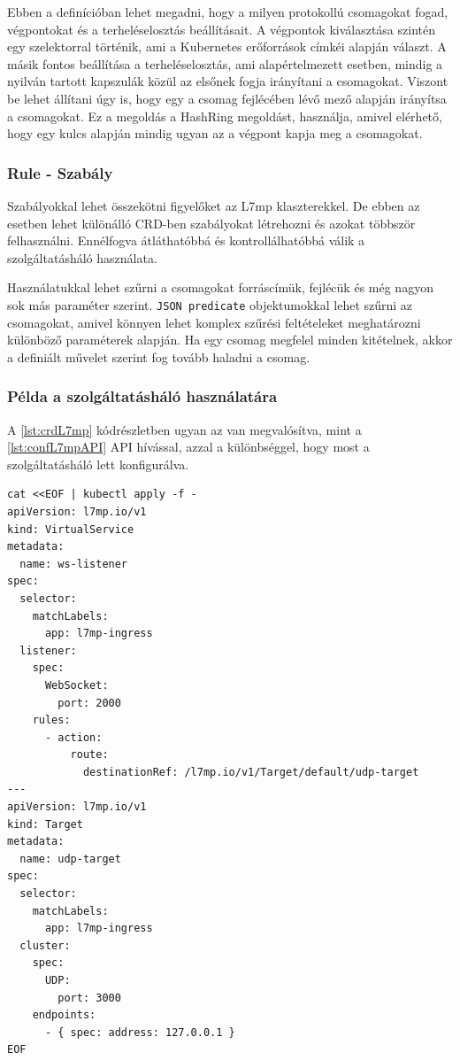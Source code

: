 Ebben a definícióban lehet megadni, hogy a milyen protokollú csomagokat fogad, végpontokat
és a terheléselosztás beállításait. A végpontok kiválasztása szintén egy szelektorral
történik, ami a Kubernetes erőforrások címkéi alapján választ. A másik fontos beállítása
a terheléselosztás, ami alapértelmezett esetben, mindig a nyilván tartott kapszulák 
közül az elsőnek fogja irányítani a csomagokat. Viszont be lehet állítani úgy is, hogy
egy a csomag fejlécében lévő mező alapján irányítsa a csomagokat. Ez a megoldás a
HashRing megoldást, használja, amivel elérhető, hogy egy kulcs alapján mindig 
ugyan az a végpont kapja meg a csomagokat. 

\subsubsection{Rule - Szabály}

Szabályokkal lehet összekötni figyelőket az L7mp klaszterekkel. De ebben az esetben lehet 
különálló CRD-ben szabályokat létrehozni és azokat többször felhasználni. Ennélfogva 
átláthatóbbá és kontrollálhatóbbá válik a szolgáltatásháló használata. 

Használatukkal lehet szűrni a csomagokat forráscímük, fejlécük és még nagyon sok más 
paraméter szerint. \texttt{JSON predicate} objektumokkal lehet szűrni az csomagokat, 
amivel könnyen lehet komplex szűrési feltételeket meghatározni különböző paraméterek 
alapján. Ha egy csomag megfelel minden kitételnek, akkor a definiált művelet szerint fog 
tovább haladni a csomag.

\subsubsection{Példa a szolgáltatásháló használatára}

A \ref{lst:crdL7mp} kódrészletben ugyan az van megvalósítva, mint a \ref{lst:confL7mpAPI}
API hívással, azzal a különbséggel, hogy most a szolgáltatásháló lett konfigurálva. 

\begin{lstlisting}[caption=L7mp szolgáltatásháló konfigurálása CRD-n keresztül, label=lst:crdL7mp]
cat <<EOF | kubectl apply -f -
apiVersion: l7mp.io/v1
kind: VirtualService
metadata:
  name: ws-listener
spec:
  selector:
    matchLabels:
      app: l7mp-ingress
  listener:
    spec:
      WebSocket:
        port: 2000
    rules:
      - action:
          route:
            destinationRef: /l7mp.io/v1/Target/default/udp-target
---
apiVersion: l7mp.io/v1
kind: Target
metadata:
  name: udp-target
spec:
  selector:
    matchLabels:
      app: l7mp-ingress
  cluster:
    spec:
      UDP:
        port: 3000
    endpoints:
      - { spec: address: 127.0.0.1 }
EOF
\end{lstlisting}

